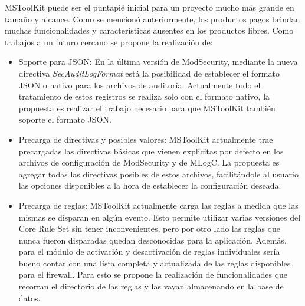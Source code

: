 

MSToolKit puede ser el puntapié inicial para un proyecto mucho más grande en tamaño y alcance. Como se mencionó anteriormente, los productos pagos brindan muchas funcionalidades y características ausentes en los productos libres. Como trabajos a un futuro cercano se propone la realización de:
\begin{itemize}
	\item Soporte para JSON: En la última versión de ModSecurity, mediante la nueva directiva \textit{SecAuditLogFormat} está la posibilidad de establecer el formato JSON o nativo para los archivos de auditoría. Actualmente todo el tratamiento de estos registros se realiza solo con el formato nativo, la propuesta es realizar el trabajo necesario para que MSToolKit también soporte el formato JSON.
	\item Precarga de directivas y posibles valores: MSToolKit actualmente trae precargadas las directivas básicas que vienen explicitas por defecto en los archivos de configuración de ModSecurity y de MLogC. La propuesta es agregar todas las directivas posibles de estos archivos, facilitándole al usuario las opciones disponibles a la hora de establecer la configuración deseada.
	\item Precarga de reglas: MSToolKit actualmente carga las reglas a medida que las mismas se disparan en algún evento. Esto permite utilizar varias versiones del Core Rule Set sin tener inconvenientes, pero por otro lado las reglas que nunca fueron disparadas quedan desconocidas para la aplicación. Además, para el módulo de activación y desactivación de reglas individuales sería bueno contar con una lista completa y actualizada de las reglas disponibles para el firewall. Para esto se propone la realización de funcionalidades que recorran el directorio de las reglas y las vayan almacenando en la base de datos.
\end{itemize}

